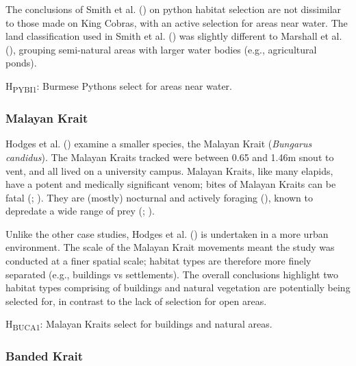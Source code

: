 \documentclass[10pt,a4paper]{article}
\begin{document}
The conclusions of Smith et al. () on python habitat selection are not dissimilar to those made on King Cobras, with an active selection for areas near water.
The land classification used in Smith et al. () was slightly different to Marshall et al. (), grouping semi-natural areas with larger water bodies (e.g., agricultural ponds).

H\textsubscript{PYBI1}: Burmese Pythons select for areas near water.

\subsubsection{Malayan Krait}\label{malayan-krait}

Hodges et al. () examine a smaller species, the Malayan Krait (\emph{Bungarus candidus}).
The Malayan Kraits tracked were between 0.65 and 1.46m snout to vent, and all lived on a university campus.
Malayan Kraits, like many elapids, have a potent and medically significant venom; bites of Malayan Kraits can be fatal (; ).
They are (mostly) nocturnal and actively foraging (), known to depredate a wide range of prey (; ).

Unlike the other case studies, Hodges et al. () is undertaken in a more urban environment.
The scale of the Malayan Krait movements meant the study was conducted at a finer spatial scale; habitat types are therefore more finely separated (e.g., buildings vs settlements).
The overall conclusions highlight two habitat types comprising of buildings and natural vegetation are potentially being selected for, in contrast to the lack of selection for open areas.

H\textsubscript{BUCA1}: Malayan Kraits select for buildings and natural areas.

\subsubsection{Banded Krait}\label{banded-krait}
\end{document}
